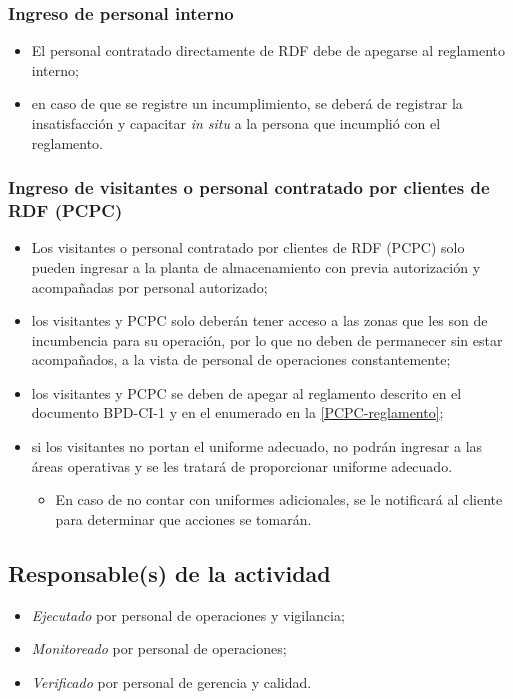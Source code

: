 \subsubsection{Ingreso de personal interno}
\begin{itemize}
	\item El personal contratado directamente de RDF debe de apegarse al reglamento interno;
	\item en caso de que se registre un incumplimiento, se deberá de registrar la insatisfacción y capacitar \emph{in situ} a la persona que incumplió con el reglamento.
\end{itemize}

\subsubsection{Ingreso de visitantes o personal contratado por clientes de RDF (PCPC)}
\label{PCPC-reglamento}

\begin{itemize}
	\item Los visitantes o personal contratado por clientes de RDF (PCPC) solo pueden ingresar a la planta de almacenamiento con previa autorización y acompañadas por personal autorizado;
	\item los visitantes y PCPC solo deberán tener acceso a las zonas que les son de incumbencia para su operación, por lo que no deben de permanecer sin estar acompañados, a la vista de personal de operaciones constantemente;
	\item los visitantes y PCPC se deben de apegar al reglamento descrito en el documento BPD-CI-1 y en el enumerado en la \cref{PCPC-reglamento};
	\item si los visitantes no portan el uniforme adecuado, no podrán ingresar a las áreas operativas y se les tratará de proporcionar uniforme adecuado.
	\begin{itemize}
		\item En caso de no contar con uniformes adicionales, se le notificará al cliente para determinar que acciones se tomarán.
	\end{itemize}
\end{itemize}

\subsection{Responsable(s) de la actividad}
\begin{itemize}
	\item \emph{Ejecutado} por personal de operaciones y vigilancia;
	\item \emph{Monitoreado} por personal de operaciones;
	\item \emph{Verificado} por personal de gerencia y calidad.
\end{itemize}

